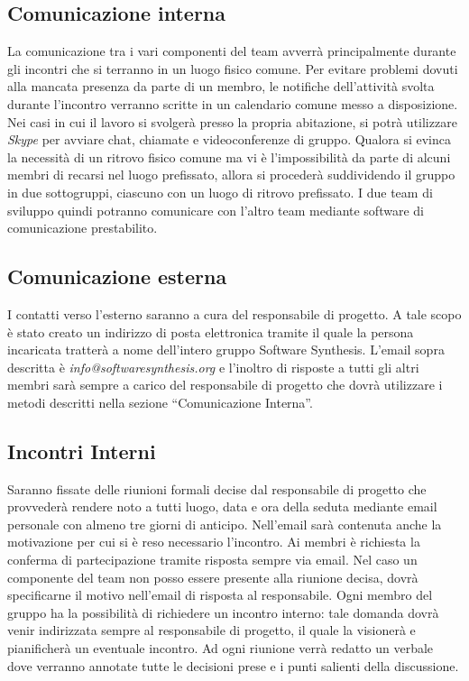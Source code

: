 \subsection{Comunicazione interna}
La comunicazione tra i vari componenti del team avverrà principalmente durante gli incontri che si terranno in un luogo fisico comune. Per evitare problemi dovuti alla mancata presenza da parte di un membro, le notifiche dell'attività svolta durante l'incontro verranno scritte in un calendario comune messo a disposizione.
Nei casi in cui il lavoro si svolgerà presso la propria abitazione, si potrà utilizzare \textit{Skype} per avviare chat, chiamate e videoconferenze di gruppo.
Qualora si evinca la necessità di un ritrovo fisico comune ma vi è l'impossibilità da parte di alcuni membri di recarsi nel luogo prefissato, allora si procederà suddividendo il gruppo in due sottogruppi, ciascuno con un luogo di ritrovo prefissato. I due team di sviluppo quindi potranno comunicare con l'altro team mediante software di comunicazione prestabilito.


\subsection{Comunicazione esterna}
I contatti verso l'esterno saranno a cura del responsabile di progetto. A tale scopo è stato creato un indirizzo di posta elettronica tramite il quale la persona incaricata tratterà a nome dell'intero gruppo Software Synthesis. L'email sopra descritta è \textit{info@softwaresynthesis.org} e l'inoltro di risposte a tutti gli altri membri sarà sempre a carico del responsabile di progetto che dovrà utilizzare i metodi descritti nella sezione ``Comunicazione Interna''.

\subsection{Incontri Interni}
Saranno fissate delle riunioni formali decise dal responsabile di progetto che provvederà rendere noto a tutti luogo, data e ora della seduta mediante email personale con almeno tre giorni di anticipo. Nell'email sarà contenuta anche la motivazione per cui si è reso necessario l'incontro. Ai membri è richiesta la conferma di partecipazione tramite risposta sempre via email. Nel caso un componente del team non posso essere presente alla riunione decisa, dovrà specificarne il motivo nell'email di risposta al responsabile.
Ogni membro del gruppo ha la possibilità di richiedere un incontro interno: tale domanda dovrà venir indirizzata sempre al responsabile di progetto, il quale la visionerà e pianificherà un eventuale incontro.
Ad ogni riunione verrà redatto un verbale dove verranno annotate tutte le decisioni prese e i punti salienti della discussione.

